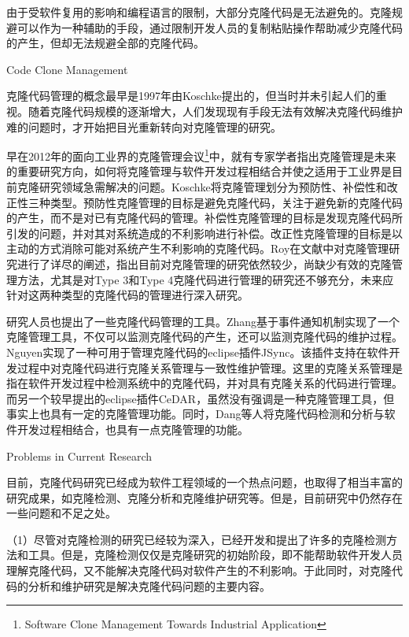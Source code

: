 由于受软件复用的影响和编程语言的限制，大部分克隆代码是无法避免的。克隆规避可以作为一种辅助的手段，通过限制开发人员的复制粘贴操作帮助减少克隆代码的产生，但却无法规避全部的克隆代码。


{Code Clone Management}

克隆代码管理的概念最早是1997年由Koschke提出的\cite{koschke2008frontiers}，但当时并未引起人们的重视。随着克隆代码规模的逐渐增大，人们发现现有手段无法有效解决克隆代码维护难的问题时，才开始把目光重新转向对克隆管理的研究。

早在2012年的面向工业界的克隆管理会议\footnote{Software Clone Management Towards Industrial Application}中，就有专家学者指出克隆管理是未来的重要研究方向，如何将克隆管理与软件开发过程相结合并使之适用于工业界是目前克隆研究领域急需解决的问题\cite{koschke2012software}。Koschke将克隆管理划分为预防性、补偿性和改正性三种类型\cite{koschke2008frontiers}。预防性克隆管理的目标是避免克隆代码，关注于避免新的克隆代码的产生，而不是对已有克隆代码的管理。补偿性克隆管理的目标是发现克隆代码所引发的问题，并对其对系统造成的不利影响进行补偿。改正性克隆管理的目标是以主动的方式消除可能对系统产生不利影响的克隆代码。Roy在文献\cite{roy2014vision}中对克隆管理研究进行了详尽的阐述，指出目前对克隆管理的研究依然较少，尚缺少有效的克隆管理方法，尤其是对Type 3和Type 4克隆代码进行管理的研究还不够充分，未来应针对这两种类型的克隆代码的管理进行深入研究。

研究人员也提出了一些克隆代码管理的工具。Zhang基于事件通知机制实现了一个克隆管理工具，不仅可以监测克隆代码的产生，还可以监测克隆代码的维护过程\cite{zhang2013towards}。Nguyen实现了一种可用于管理克隆代码的eclipse插件JSync\cite{nguyen2012clone}。该插件支持在软件开发过程中对克隆代码进行克隆关系管理与一致性维护管理。这里的克隆关系管理是指在软件开发过程中检测系统中的克隆代码，并对具有克隆关系的代码进行管理。而另一个较早提出的eclipse插件CeDAR\cite{tairas2012increasing}，虽然没有强调是一种克隆管理工具，但事实上也具有一定的克隆管理功能。同时，Dang等人将克隆代码检测和分析与软件开发过程相结合，也具有一点克隆管理的功能\cite{dang2017transferring}。

{Problems in Current Research}

目前，克隆代码研究已经成为软件工程领域的一个热点问题，也取得了相当丰富的研究成果，如克隆检测、克隆分析和克隆维护研究等。但是，目前研究中仍然存在一些问题和不足之处。

（1）尽管对克隆检测的研究已经较为深入，已经开发和提出了许多的克隆检测方法和工具。但是，克隆检测仅仅是克隆研究的初始阶段，即不能帮助软件开发人员理解克隆代码，又不能解决克隆代码对软件产生的不利影响。于此同时，对克隆代码的分析和维护研究是解决克隆代码问题的主要内容。

